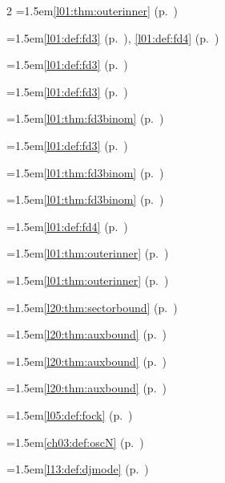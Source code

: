 \begin{multicols}{2}
\hangindent=1.5em\quad \ref{l01:thm:outerinner} (p.~\pageref{l01:thm:outerinner})\par
\hangindent=1.5em\quad \ref{l01:def:fd3} (p.~\pageref{l01:def:fd3}), \ref{l01:def:fd4} (p.~\pageref{l01:def:fd4})\par
\hangindent=1.5em\quad \ref{l01:def:fd3} (p.~\pageref{l01:def:fd3})\par
\hangindent=1.5em\quad \ref{l01:def:fd3} (p.~\pageref{l01:def:fd3})\par
\hangindent=1.5em\quad \ref{l01:thm:fd3binom} (p.~\pageref{l01:thm:fd3binom})\par
\hangindent=1.5em\quad \ref{l01:def:fd3} (p.~\pageref{l01:def:fd3})\par
\hangindent=1.5em\quad \ref{l01:thm:fd3binom} (p.~\pageref{l01:thm:fd3binom})\par
\hangindent=1.5em\quad \ref{l01:thm:fd3binom} (p.~\pageref{l01:thm:fd3binom})\par
\hangindent=1.5em\quad \ref{l01:def:fd4} (p.~\pageref{l01:def:fd4})\par
\hangindent=1.5em\quad \ref{l01:thm:outerinner} (p.~\pageref{l01:thm:outerinner})\par
\hangindent=1.5em\quad \ref{l01:thm:outerinner} (p.~\pageref{l01:thm:outerinner})\par
\hangindent=1.5em\quad \ref{l20:thm:sectorbound} (p.~\pageref{l20:thm:sectorbound})\par
\hangindent=1.5em\quad \ref{l20:thm:auxbound} (p.~\pageref{l20:thm:auxbound})\par
\hangindent=1.5em\quad \ref{l20:thm:auxbound} (p.~\pageref{l20:thm:auxbound})\par
\hangindent=1.5em\quad \ref{l20:thm:auxbound} (p.~\pageref{l20:thm:auxbound})\par
\hangindent=1.5em\quad \ref{l05:def:fock} (p.~\pageref{l05:def:fock})\par
\hangindent=1.5em\quad \ref{ch03:def:oscN} (p.~\pageref{ch03:def:oscN})\par
\hangindent=1.5em\quad \ref{l13:def:djmode} (p.~\pageref{l13:def:djmode})\par

\end{multicols}
